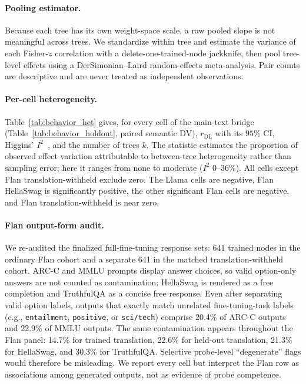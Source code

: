 \documentclass{article}
\theoremstyle{definition}
\theoremstyle{plain}
\begin{document}
\paragraph{Pooling estimator.} Because each tree has its own weight-space scale, a raw pooled slope is
not meaningful across trees. We standardize within tree and estimate the variance of each Fisher-$z$
correlation with a delete-one-trained-node jackknife, then pool tree-level effects using a
DerSimonian--Laird random-effects meta-analysis. Pair counts are descriptive and are never treated as
independent observations.

\paragraph{Per-cell heterogeneity.} Table~\ref{tab:behavior_het} gives, for every cell of the main-text
bridge (Table~\ref{tab:behavior_holdout}, paired semantic DV), $r_{\mathrm{DL}}$ with its $95\%$ CI,
Higgins' $I^2$~\citep{higgins2003measuring}, and the number of trees $k$. The statistic estimates the
proportion of observed effect variation attributable to between-tree heterogeneity rather than
sampling error; here it ranges from none to moderate ($I^2$ $0$--$36\%$). All cells except Flan
translation-withheld exclude zero. The Llama cells are negative, Flan HellaSwag is significantly
positive, the other significant Flan cells are negative, and Flan translation-withheld is near zero.

\paragraph{Flan output-form audit.} We re-audited the finalized full-fine-tuning response sets: 641
trained nodes in the ordinary Flan cohort and a separate 641 in the matched translation-withheld
cohort. ARC-C and MMLU prompts display answer choices, so valid option-only answers are not counted as
contamination; HellaSwag is rendered as a free completion and TruthfulQA as a concise free response.
Even after separating valid option labels, outputs that exactly match unrelated fine-tuning-task
labels (e.g., \texttt{entailment}, \texttt{positive}, or \texttt{sci/tech}) comprise 20.4\% of ARC-C
outputs and 22.9\% of MMLU outputs. The same contamination appears throughout the Flan panel: 14.7\%
for trained translation, 22.6\% for held-out translation, 21.3\% for HellaSwag, and 30.3\% for
TruthfulQA. Selective probe-level ``degenerate'' flags would therefore be misleading. We report every
cell but interpret the Flan row as associations among generated outputs, not as evidence of probe
competence.
\end{document}
